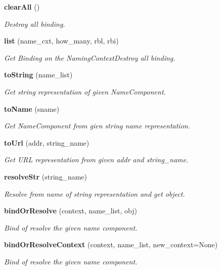 \begin{CompactItemize}
{\bf clear\-All} ()
\begin{CompactList}\small\item\em Destroy all binding. \item\end{CompactList}\item 
{\bf list} (name\_\-cxt, how\_\-many, rbl, rbi)
\begin{CompactList}\small\item\em Get Binding on the Naming\-Context\-Destroy all binding. \item\end{CompactList}\item 
{\bf to\-String} (name\_\-list)
\begin{CompactList}\small\item\em Get string representation of given Name\-Component. \item\end{CompactList}\item 
{\bf to\-Name} (sname)
\begin{CompactList}\small\item\em Get Name\-Component from gien string name representation. \item\end{CompactList}\item 
{\bf to\-Url} (addr, string\_\-name)
\begin{CompactList}\small\item\em Get URL representation from given addr and string\_\-name. \item\end{CompactList}\item 
{\bf resolve\-Str} (string\_\-name)
\begin{CompactList}\small\item\em Resolve from name of string representation and get object. \item\end{CompactList}\item 
{\bf bind\-Or\-Resolve} (context, name\_\-list, obj)
\begin{CompactList}\small\item\em Bind of resolve the given name component. \item\end{CompactList}\item 
{\bf bind\-Or\-Resolve\-Context} (context, name\_\-list, new\_\-context=None)
\begin{CompactList}\small\item\em Bind of resolve the given name component. \item\end{CompactList}\item 

\end{CompactItemize}

